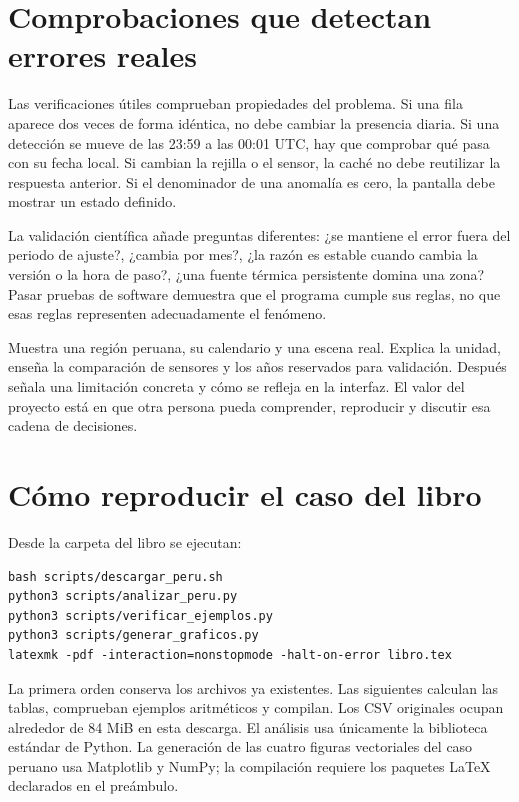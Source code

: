 \section{Comprobaciones que detectan errores reales}

Las verificaciones útiles comprueban propiedades del problema. Si una fila aparece
dos veces de forma idéntica, no debe cambiar la presencia diaria. Si una detección
se mueve de las 23:59 a las 00:01 UTC, hay que comprobar qué pasa con su fecha local.
Si cambian la rejilla o el sensor, la caché no debe reutilizar la respuesta anterior.
Si el denominador de una anomalía es cero, la pantalla debe mostrar un estado definido.

La validación científica añade preguntas diferentes: ¿se mantiene el error fuera del
periodo de ajuste?, ¿cambia por mes?, ¿la razón es estable cuando cambia la versión o
la hora de paso?, ¿una fuente térmica persistente domina una zona? Pasar pruebas de
software demuestra que el programa cumple sus reglas, no que esas reglas representen
adecuadamente el fenómeno.

\begin{parareto}
Muestra una región peruana, su calendario y una escena real. Explica la unidad, enseña
la comparación de sensores y los años reservados para validación. Después señala una
limitación concreta y cómo se refleja en la interfaz. El valor del proyecto está en
que otra persona pueda comprender, reproducir y discutir esa cadena de decisiones.
\end{parareto}

\FloatBarrier
\section{Cómo reproducir el caso del libro}

Desde la carpeta del libro se ejecutan:
\begin{lstlisting}
bash scripts/descargar_peru.sh
python3 scripts/analizar_peru.py
python3 scripts/verificar_ejemplos.py
python3 scripts/generar_graficos.py
latexmk -pdf -interaction=nonstopmode -halt-on-error libro.tex
\end{lstlisting}
La primera orden conserva los archivos ya existentes. Las siguientes calculan las
tablas, comprueban ejemplos aritméticos y compilan. Los CSV originales ocupan alrededor
de 84 MiB en esta descarga. El análisis usa únicamente la biblioteca estándar de
Python. La generación de las cuatro figuras vectoriales del caso peruano usa Matplotlib
y NumPy; la compilación requiere los paquetes LaTeX declarados en el preámbulo.

